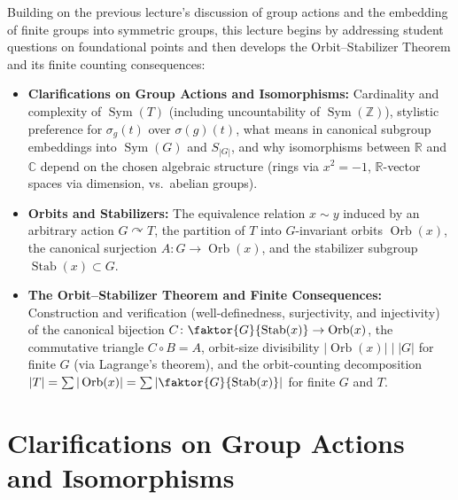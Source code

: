 

\begin{overview}
Building on the previous lecture's discussion of group actions and the embedding of finite groups into symmetric groups, this lecture begins by addressing student questions on foundational points and then develops the Orbit--Stabilizer Theorem and its finite counting consequences:
\begin{itemize}
    \item \textbf{Clarifications on Group Actions and Isomorphisms:} Cardinality and complexity of $\operatorname{Sym}(T)$ (including uncountability of $\operatorname{Sym}(\mathbb{Z})$), stylistic preference for $\sigma_g(t)$ over $\sigma(g)(t)$, what  means in canonical subgroup embeddings into $\operatorname{Sym}(G)$ and $S_{|G|}$, and why isomorphisms between $\mathbb{R}$ and $\mathbb{C}$ depend on the chosen algebraic structure (rings via $x^2 = -1$, $\mathbb{R}$-vector spaces via dimension, vs.\ abelian groups).
    \item \textbf{Orbits and Stabilizers:} The equivalence relation $x \sim y$ induced by an arbitrary action $G \curvearrowright T$, the partition of $T$ into $G$-invariant orbits $\operatorname{Orb}(x)$, the canonical surjection $A \colon G \to \operatorname{Orb}(x)$, and the stabilizer subgroup $\operatorname{Stab}(x) \subset G$.
    \item \textbf{The Orbit--Stabilizer Theorem and Finite Consequences:} Construction and verification (well-definedness, surjectivity, and injectivity) of the canonical bijection $C \colon \faktor{G}{\operatorname{Stab}(x)} \to \operatorname{Orb}(x)$, the commutative triangle $C \circ B = A$, orbit-size divisibility $|\operatorname{Orb}(x)| \;\big|\; |G|$ for finite $G$ (via Lagrange's theorem), and the orbit-counting decomposition $|T| = \sum |\operatorname{Orb}(x)| = \sum \left|\faktor{G}{\operatorname{Stab}(x)}\right|$ for finite $G$ and $T$.
\end{itemize}
\end{overview}

\section{Clarifications on Group Actions and Isomorphisms}

